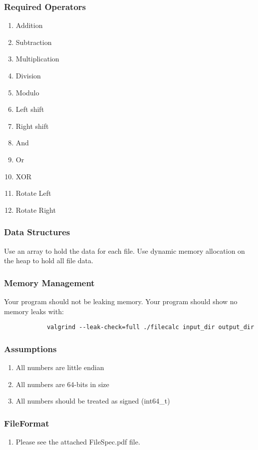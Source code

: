 \documentclass[letterpaper,12pt]{article}
\begin{document}
	\subsubsection{Required Operators}
		\begin{enumerate}
			\item Addition 
			\item Subtraction
			\item Multiplication
			\item Division
			\item Modulo 
			\item Left shift 
			\item Right shift 
			\item And
			\item Or
			\item XOR
			\item Rotate Left
			\item Rotate Right
		\end{enumerate}
	
	\subsubsection{Data Structures}
	Use an array to hold the data for each file. Use dynamic memory allocation on the heap to hold all file data.
	
	\subsubsection{Memory Management}
	Your program should not be leaking memory. Your program should show no memory leaks with:
		\begin{lstlisting}
			valgrind --leak-check=full ./filecalc input_dir output_dir 
		\end{lstlisting}
	
	\subsubsection{Assumptions}
		\begin{enumerate}
			\item All numbers are little endian
			\item All numbers are 64-bits in size
			\item All numbers should be treated as signed (int64\_t)
		\end{enumerate}
	\subsubsection{FileFormat}
		\begin{enumerate}
			\item Please see the attached FileSpec.pdf file.
		\end{enumerate}
\end{document}

